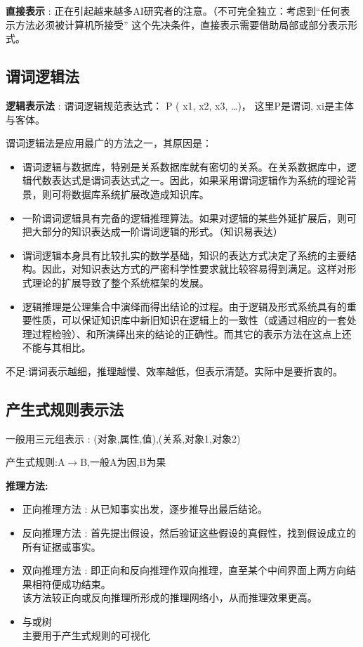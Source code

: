 \documentclass[UTF8,a4paper]{ctexart}
\begin{document}
\textbf{直接表示} : 正在引起越来越多AI研究者的注意。（不可完全独立：考虑到“任何表示方法必须被计算机所接受” 这个先决条件，直接表示需要借助局部或部分表示形式。

\subsection{谓词逻辑法}

\textbf{逻辑表示法} : 谓词逻辑规范表达式：
P ( x1, x2, x3, …)， 这里P是谓词, xi是主体与客体。

谓词逻辑法是应用最广的方法之一，其原因是：
\begin{itemize}
	\item 谓词逻辑与数据库，特别是关系数据库就有密切的关系。在关系数据库中，逻辑代数表达式是谓词表达式之一。因此，如果采用谓词逻辑作为系统的理论背景，则可将数据库系统扩展改造成知识库。
	\item 一阶谓词逻辑具有完备的逻辑推理算法。如果对逻辑的某些外延扩展后，则可把大部分的知识表达成一阶谓词逻辑的形式。（知识易表达）
	\item 谓词逻辑本身具有比较扎实的数学基础，知识的表达方式决定了系统的主要结构。因此，对知识表达方式的严密科学性要求就比较容易得到满足。这样对形式理论的扩展导致了整个系统框架的发展。
	\item 逻辑推理是公理集合中演绎而得出结论的过程。由于逻辑及形式系统具有的重要性质，可以保证知识库中新旧知识在逻辑上的一致性（或通过相应的一套处理过程检验）、和所演绎出来的结论的正确性。而其它的表示方法在这点上还不能与其相比。
\end{itemize}

不足:谓词表示越细，推理越慢、效率越低，但表示清楚。实际中是要折衷的。


\subsection{产生式规则表示法}
一般用三元组表示 : (对象,属性,值),(关系,对象1,对象2)

产生式规则:A$\to$B,一般A为因,B为果

\textbf{推理方法:}
\begin{itemize}
	\item 正向推理方法 : 从已知事实出发，逐步推导出最后结论。

	\item 反向推理方法 : 首先提出假设，然后验证这些假设的真假性，找到假设成立的所有证据或事实。

	\item 双向推理方法 : 即正向和反向推理作双向推理，直至某个中间界面上两方向结果相符便成功结束。\\
	      该方法较正向或反向推理所形成的推理网络小，从而推理效果更高。

	\item 与或树\\
	      主要用于产生式规则的可视化

\end{itemize}
\end{document}
